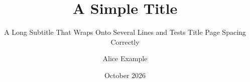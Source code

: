 \documentclass[11pt]{beamer}
\title{A Simple Title}
\subtitle{A Long Subtitle That Wraps Onto Several Lines and Tests Title Page Spacing Correctly}
\author{Alice Example}
\institute{Example University}
\date{October 2026}
\begin{document}
\begin{frame}\titlepage\end{frame}
\end{document}
